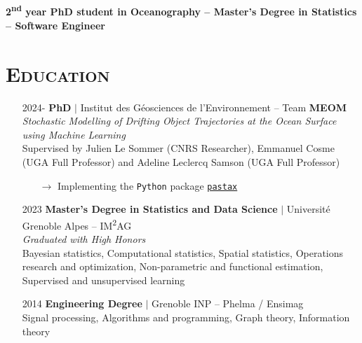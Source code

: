 \documentclass{article}
\begin{document}
\\[.1 cm]

\begin{center}
    \large{\textbf{2\textsuperscript{nd} year PhD student in Oceanography – Master's Degree in Statistics – Software Engineer}}
\end{center}

\section*{\textsc{Education}}
\begin{itemize}
    \item[] 2024- \tabto{2cm} \textbf{PhD} $\vert$ Institut des Géosciences de l'Environnement – Team \textbf{MEOM} \\[.1 cm]
    \tabto{2cm} \textit{Stochastic Modelling of Drifting Object Trajectories at the Ocean Surface using Machine Learning} \\[.1 cm]
    \tabto{2cm} Supervised by Julien Le Sommer (CNRS Researcher), Emmanuel Cosme (UGA Full Professor) and \tabto{2cm} Adeline Leclercq Samson (UGA Full Professor)
    \vspace{-.1 cm}
    \begin{itemize}[left=2cm]
        \item[$\rightarrow$] Implementing the \texttt{Python} package \href{https://github.com/vadmbertr/pastax}{\texttt{pastax}}
    \end{itemize}
    \item[] 2023 \tabto{2cm} \textbf{Master’s Degree in Statistics and Data Science} $\vert$ Université Grenoble Alpes – IM\textsuperscript{2}AG \\[.15 cm]
    \tabto{2cm} \textit{Graduated with High Honors} \\[.1 cm]
    \tabto{2cm} Bayesian statistics, Computational statistics, Spatial statistics, Operations research and optimization, \tabto{2cm} Non-parametric and functional estimation, Supervised and unsupervised learning
    \item[] 2014 \tabto{2cm} \textbf{Engineering Degree} $\vert$ Grenoble INP – Phelma / Ensimag \\[.1 cm]
    \tabto{2cm} Signal processing, Algorithms and programming, Graph theory, Information theory
\end{itemize}
\end{document}
